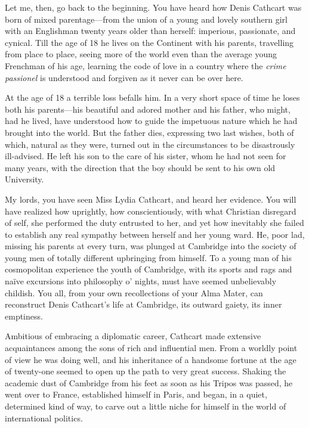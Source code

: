 \begin{dialogue}
Let me, then, go back to the beginning. You have heard how Denis Cathcart was born of mixed parentage\allowbreak---\allowbreak from the union of a young and lovely southern girl with an Englishman twenty years older than herself: imperious, passionate, and cynical. Till the age of 18 he lives on the Continent with his parents, travelling from place to place, seeing more of the world even than the average young Frenchman of his age, learning the code of love in a country where the \textit{crime passionel} is understood and forgiven as it never can be over here.

\smallskip 

At the age of 18 a terrible loss befalls him. In a very short space of time he loses both his parents\allowbreak---\allowbreak his beautiful and adored mother and his father, who might, had he lived, have understood how to guide the impetuous nature which he had brought into the world. But the father dies, expressing two last wishes, both of which, natural as they were, turned out in the circumstances to be disastrously ill-advised. He left his son to the care of his sister, whom he had not seen for many years, with the direction that the boy should be sent to his own old University.

\smallskip 

My lords, you have seen Miss Lydia Cathcart, and heard her evidence. You will have realized how uprightly, how conscientiously, with what Christian disregard of self, she performed the duty entrusted to her, and yet how inevitably she failed to establish any real sympathy between herself and her young ward. He, poor lad, missing his parents at every turn, was plunged at Cambridge into the society of young men of totally different upbringing from himself. To a young man of his cosmopolitan experience the youth of Cambridge, with its sports and rags and naïve excursions into philosophy o' nights, must have seemed unbelievably childish. You all, from your own recollections of your Alma Mater, can reconstruct Denis Cathcart's life at Cambridge, its outward gaiety, its inner emptiness.

\smallskip 

Ambitious of embracing a diplomatic career, Cathcart made extensive acquaintances among the sons of rich and influential men. From a worldly point of view he was doing well, and his inheritance of a handsome fortune at the age of twenty-one seemed to open up the path to very great success. Shaking the academic dust of Cambridge from his feet as soon as his Tripos was passed, he went over to France, established himself in Paris, and began, in a quiet, determined kind of way, to carve out a little niche for himself in the world of international politics.


\end{dialogue}
